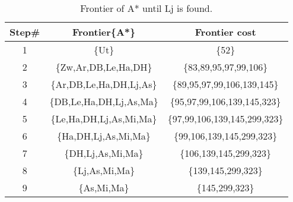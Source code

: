 \documentclass[11px]{article}
\begin{document}
\begin{table}[h]
\centering
\begin{adjustbox}{width=0.5\linewidth}
\begin{tabular}{c|c|c|}

  Step\#  & Frontier\{A*\} & Frontier cost \\ \hline
     1 & \{Ut\} & \{52\} \\
     2 & \{Zw,Ar,DB,Le,Ha,DH\} & \{83,89,95,97,99,106\} \\
     3 & \{Ar,DB,Le,Ha,DH,Lj,As\} & \{89,95,97,99,106,139,145\} \\
     4 & \{DB,Le,Ha,DH,Lj,As,Ma\} & \{95,97,99,106,139,145,323\} \\
     5 & \{Le,Ha,DH,Lj,As,Mi,Ma\} & \{97,99,106,139,145,299,323\} \\
     6 & \{Ha,DH,Lj,As,Mi,Ma\} & \{99,106,139,145,299,323\} \\
     7 & \{DH,Lj,As,Mi,Ma\} & \{106,139,145,299,323\} \\
     8 & \{Lj,As,Mi,Ma\} & \{139,145,299,323\} \\
     9 & \{As,Mi,Ma\} & \{145,299,323\} \\
     
\end{tabular}
\end{adjustbox}
\caption{Frontier of A* until Lj is found.} 
\end{table}
\end{document}
